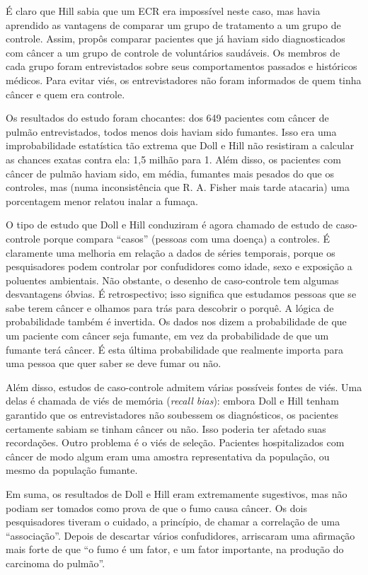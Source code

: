 \documentclass[11pt,a5paper,twoside]{book}
\begin{document}
É claro que Hill sabia que um ECR era impossível neste caso, mas havia aprendido as vantagens de comparar um grupo de tratamento a um grupo de controle. Assim, propôs comparar pacientes que já haviam sido diagnosticados com câncer a um grupo de controle de voluntários saudáveis. Os membros de cada grupo foram entrevistados sobre seus comportamentos passados e históricos médicos. Para evitar viés, os entrevistadores não foram informados de quem tinha câncer e quem era controle.

Os resultados do estudo foram chocantes: dos 649 pacientes com câncer de pulmão entrevistados, todos menos dois haviam sido fumantes. Isso era uma improbabilidade estatística tão extrema que Doll e Hill não resistiram a calcular as chances exatas contra ela: 1,5 milhão para 1. Além disso, os pacientes com câncer de pulmão haviam sido, em média, fumantes mais pesados do que os controles, mas (numa inconsistência que R. A. Fisher mais tarde atacaria) uma porcentagem menor relatou inalar a fumaça.

O tipo de estudo que Doll e Hill conduziram é agora chamado de estudo de caso-controle porque compara “casos” (pessoas com uma doença) a controles. É claramente uma melhoria em relação a dados de séries temporais, porque os pesquisadores podem controlar por confudidores como idade, sexo e exposição a poluentes ambientais. Não obstante, o desenho de caso-controle tem algumas desvantagens óbvias. É retrospectivo; isso significa que estudamos pessoas que se sabe terem câncer e olhamos para trás para descobrir o porquê. A lógica de probabilidade também é invertida. Os dados nos dizem a probabilidade de que um paciente com câncer seja fumante, em vez da probabilidade de que um fumante terá câncer. É esta última probabilidade que realmente importa para uma pessoa que quer saber se deve fumar ou não.

Além disso, estudos de caso-controle admitem várias possíveis fontes de viés. Uma delas é chamada de viés de memória (\textit{recall bias}): embora Doll e Hill tenham garantido que os entrevistadores não soubessem os diagnósticos, os pacientes certamente sabiam se tinham câncer ou não. Isso poderia ter afetado suas recordações. Outro problema é o viés de seleção. Pacientes hospitalizados com câncer de modo algum eram uma amostra representativa da população, ou mesmo da população fumante.

Em suma, os resultados de Doll e Hill eram extremamente sugestivos, mas não podiam ser tomados como prova de que o fumo causa câncer. Os dois pesquisadores tiveram o cuidado, a princípio, de chamar a correlação de uma “associação”. Depois de descartar vários confudidores, arriscaram uma afirmação mais forte de que “o fumo é um fator, e um fator importante, na produção do carcinoma do pulmão”.
\end{document}
